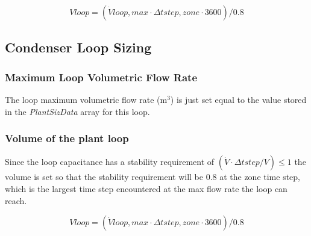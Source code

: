 \begin{equation}
Vloop = (\dot Vloop,max\cdot \Delta tstep,zone\cdot 3600)/0.8
\end{equation}

\subsection{Condenser Loop Sizing}\label{condenser-loop-sizing}

\subsubsection{Maximum Loop Volumetric Flow Rate}\label{maximum-loop-volumetric-flow-rate-1}

The loop maximum volumetric flow rate (m\(^{3}\)) is just set equal to the value stored in the \emph{PlantSizData} array for this loop.

\subsubsection{Volume of the plant loop}\label{volume-of-the-plant-loop-1}

Since the loop capacitance has a stability requirement of \((\dot V\cdot \Delta tstep/V) \le 1\) the volume is set so that the stability requirement will be 0.8 at the zone time step, which is the largest time step encountered at the max flow rate the loop can reach.

\begin{equation}
Vloop = (\dot Vloop,max\cdot \Delta tstep,zone\cdot 3600)/0.8
\end{equation}
